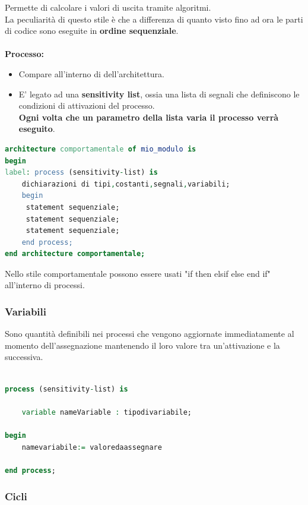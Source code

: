 \documentclass[a4paper]{book}
\begin{document}
Permette di calcolare i valori di uscita tramite algoritmi.\\
La peculiarità di questo stile è che a differenza di quanto visto fino ad ora le parti di codice sono eseguite in \textbf{ordine sequenziale}.\\\\
\textbf{Processo:}
\begin{itemize}
\item Compare all'interno di dell'architettura.
\item E' legato ad una \textbf{sensitivity list}, ossia una lista di segnali che definiscono le condizioni di attivazioni del processo.\\\textbf{Ogni volta che un parametro della lista varia il processo verrà eseguito}.


\end{itemize}

\begin{lstlisting}[language=VHDL]
architecture comportamentale of mio_modulo is
begin
label: process (sensitivity-list) is
	dichiarazioni di tipi,costanti,segnali,variabili;
	begin
	 statement sequenziale;
	 statement sequenziale;
	 statement sequenziale;
	end process;
end architecture comportamentale;
\end{lstlisting}
Nello stile comportamentale possono essere usati "if then elsif else end if" all'interno di processi.


\subsubsection{Variabili}

Sono quantità definibili nei processi che vengono aggiornate immediatamente al momento dell'assegnazione mantenendo il loro valore tra un'attivazione e la successiva.

\begin{lstlisting}[language=VHDL]

process (sensitivity-list) is

	variable nameVariable : tipodivariabile;
	
begin
	namevariabile:= valoredaassegnare

end process;


\end{lstlisting}

\subsubsection{Cicli}
\end{document}
